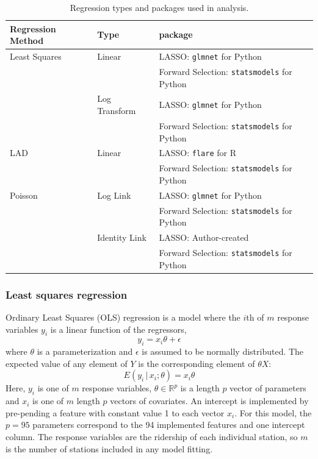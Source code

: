 \documentclass[11pt]{article}
\begin{document}
\begin{table} [H]
\centering
\begin{tabular}{lll}
\toprule Regression Method&Type&package\\
\midrule Least Squares&Linear&LASSO: \texttt{glmnet} for Python\\
&&Forward Selection: \texttt{statsmodels} for Python\\
&Log Transform&LASSO: \texttt{glmnet} for Python\\
&&Forward Selection: \texttt{statsmodels} for Python\\
LAD&Linear&LASSO: \texttt{flare} for R\\
&&Forward Selection: \texttt{statsmodels} for Python\\
Poisson&Log Link&LASSO: \texttt{glmnet} for Python\\
&&Forward Selection: \texttt{statsmodels} for Python\\
&Identity Link&LASSO: Author-created\\
&&Forward Selection: \texttt{statsmodels} for Python\\
\bottomrule
\end{tabular}
\caption{Regression types and packages used in analysis.}
\label{tab:regtype}
\end{table}



\subsubsection{Least squares regression}\label{sec:lstsq}

Ordinary Least Squares (OLS) regression is a model where the $i$th of $m$ response variables $y_i$ is a linear function of the regressors,
\[y_i = x_i\theta + \epsilon\] where $\theta$ is a parameterization and $\epsilon$ is assumed to be normally distributed. The expected value of any element of $Y$ is the corresponding element of $\theta X$:
\[E(y_i\,|\,x_i; \theta) = x_i\theta\]
Here, $y_i$ is one of $m$ response variables, $\theta\in\mathbb{R}^p$ is a length $p$ vector of parameters and $x_i$ is one of $m$ length $p$ vectors of covariates. An intercept is implemented by pre-pending a feature with constant value 1 to each vector $x_i$. For this model, the $p=95$ parameters correspond to the 94 implemented features and one intercept column. The response variables are the ridership of each individual station, so $m$ is the number of stations included in any model fitting.  
\end{document}

